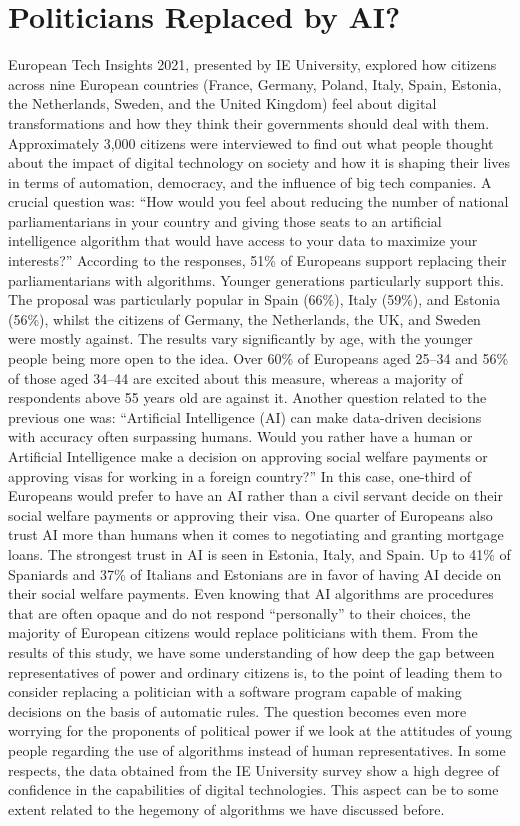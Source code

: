 \section{\label{sec:8.6}Politicians Replaced by AI?}

European Tech Insights 2021, presented by IE University, explored how citizens across nine European countries (France, Germany, Poland, Italy, Spain, Estonia, the Netherlands, Sweden, and the United Kingdom) feel about digital transformations and how they think their governments should deal with them. Approximately 3,000 citizens were interviewed to find out what people thought about the impact of digital technology on society and how it is shaping their lives in terms of automation, democracy, and the influence of big tech companies. A crucial question was: ``How would you feel about reducing the number of national parliamentarians in your country and giving those seats to an artificial intelligence algorithm that would have access to your data to maximize your interests?'' According to the responses, 51\% of Europeans support replacing their parliamentarians with algorithms. Younger generations particularly support this. The proposal was particularly popular in Spain (66\%), Italy (59\%), and Estonia (56\%), whilst the citizens of Germany, the Netherlands, the UK, and Sweden were mostly against. The results vary significantly by age, with the younger people being more open to the idea. Over 60\% of Europeans aged 25--34 and 56\% of those aged 34--44 are excited about this measure, whereas a majority of respondents above 55 years old are against it. Another question related to the previous one was: ``Artificial Intelligence (AI) can make data-driven decisions with accuracy often surpassing humans. Would you rather have a human or Artificial Intelligence make a decision on approving social welfare payments or approving visas for working in a foreign country?'' In this case, one-third of Europeans would prefer to have an AI rather than a civil servant decide on their social welfare payments or approving their visa. One quarter of Europeans also trust AI more than humans when it comes to negotiating and granting mortgage loans. The strongest trust in AI is seen in Estonia, Italy, and Spain. Up to 41\% of Spaniards and 37\% of Italians and Estonians are in favor of having AI decide on their social welfare payments. Even knowing that AI algorithms are procedures that are often opaque and do not respond ``personally'' to their choices, the majority of European citizens would replace politicians with them. From the results of this study, we have some understanding of how deep the gap between representatives of power and ordinary citizens is, to the point of leading them to consider replacing a politician with a software program capable of making decisions on the basis of automatic rules. The question becomes even more worrying for the proponents of political power if we look at the attitudes of young people regarding the use of algorithms instead of human representatives. In some respects, the data obtained from the IE University survey show a high degree of confidence in the capabilities of digital technologies. This aspect can be to some extent related to the hegemony of algorithms we have discussed before.

